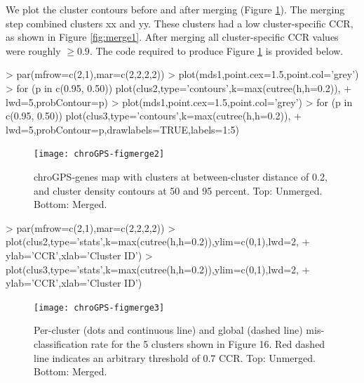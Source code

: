 \documentclass[a4paper,12pt,nogin]{article}
\newcommand{\newtext}[1]{{\color{blue} #1}} %
\begin{document}
\newtext{
  We plot the cluster contours before and after merging (Figure \ref{fig:merge2}).
  The merging step combined clusters xx and yy. These clusters had a low cluster-specific CCR,
  as shown in Figure \ref{fig:merge1}.
  After merging all cluster-specific CCR values were roughly $\geq 0.9$. 
  The code required to produce Figure \ref{fig:merge2} is provided below.
}

\footnotesize

\begin{Schunk}
\begin{Sinput}
> par(mfrow=c(2,1),mar=c(2,2,2,2))
> plot(mds1,point.cex=1.5,point.col='grey')
> for (p in c(0.95, 0.50)) plot(clus2,type='contours',k=max(cutree(h,h=0.2)),
+ lwd=5,probContour=p)
> plot(mds1,point.cex=1.5,point.col='grey')
> for (p in c(0.95, 0.50)) plot(clus3,type='contours',k=max(cutree(h,h=0.2)),
+ lwd=5,probContour=p,drawlabels=TRUE,labels=1:5)
\end{Sinput}
\end{Schunk}

\normalsize

\begin{figure}
\begin{center}
\texttt{[image: chroGPS-figmerge2]}
\end{center}
\caption{chroGPS-genes map with clusters at between-cluster distance of 0.2, and cluster density contours at 50 and 95 percent. Top: Unmerged. Bottom: Merged. }
\label{fig:merge2}
\end{figure}

\footnotesize

\begin{Schunk}
\begin{Sinput}
> par(mfrow=c(2,1),mar=c(2,2,2,2))
> plot(clus2,type='stats',k=max(cutree(h,h=0.2)),ylim=c(0,1),lwd=2,
+ ylab='CCR',xlab='Cluster ID')
> plot(clus3,type='stats',k=max(cutree(h,h=0.2)),ylim=c(0,1),lwd=2,
+ ylab='CCR',xlab='Cluster ID')
\end{Sinput}
\end{Schunk}

\normalsize

\begin{figure}
\begin{center}
\texttt{[image: chroGPS-figmerge3]}
\end{center}
\caption{Per-cluster (dots and continuous line) and global (dashed line) mis-classification rate for the 5 clusters
  shown in Figure 16. Red dashed line indicates an arbitrary threshold of 0.7 CCR. Top: Unmerged. Bottom: Merged.}
\label{fig:merge3}
\end{figure}
\end{document}
